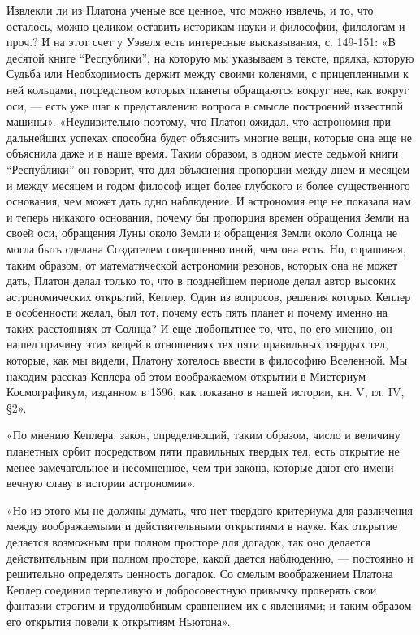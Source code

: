 Извлекли ли из Платона ученые все ценное, что можно извлечь, и то,
что осталось, можно целиком оставить историкам науки и философии,
филологам и проч.? И на этот счет у Уэвеля есть интересные
высказывания, с. 149-151: «В десятой книге ``Республики'', на которую
мы указываем в тексте, прялка, которую Судьба или Необходимость держит
между своими коленями, с прицепленными к ней кольцами, посредством
которых планеты обращаются вокруг нее, как вокруг оси, --- есть уже
шаг к представлению вопроса в смысле построений известной машины».
«Неудивительно поэтому, что Платон ожидал, что астрономия при
дальнейших успехах способна будет объяснить многие вещи, которые она
еще не объяснила даже и в наше время. Таким образом, в одном месте
седьмой книги ``Республики'' он говорит, что для объяснения пропорции
между днем и месяцем и между месяцем и годом философ ищет более
глубокого и более существенного основания, чем может дать одно
наблюдение. И астрономия еще не показала нам и теперь никакого
основания, почему бы пропорция времен обращения Земли на своей оси,
обращения Луны около Земли и обращения Земли около Солнца не могла
быть сделана Создателем совершенно иной, чем она есть. Но, спрашивая,
таким образом, от математической астрономии резонов, которых она не
может дать, Платон делал только то, что в позднейшем периоде делал
автор высоких астрономических открытий, Кеплер. Один из вопросов,
решения которых Кеплер в особенности желал, был тот, почему есть пять
планет и почему именно на таких расстояниях от Солнца? И еще
любопытнее то, что, по его мнению, он нашел причину этих вещей в
отношениях тех пяти правильных твердых тел, которые, как мы видели,
Платону хотелось ввести в философию Вселенной. Мы находим рассказ
Кеплера об этом воображаемом открытии в Мистериум Космографикум,
изданном в 1596, как показано в нашей истории, кн. V, гл. IV, §2».

«По мнению Кеплера, закон, определяющий, таким образом, число и
величину планетных орбит посредством пяти правильных твердых тел, есть
открытие не менее замечательное и несомненное, чем три закона, которые
дают его имени вечную славу в истории астрономии».

«Но из этого мы не должны думать, что нет твердого критериума для
различения между воображаемыми и действительными открытиями в науке.
Как открытие делается возможным при полном просторе для догадок, так
оно делается действительным при полном просторе, какой дается
наблюдению, --- постоянно и решительно определять ценность догадок. Со
смелым воображением Платона Кеплер соединил терпеливую и
добросовестную привычку проверять свои фантазии строгим и трудолюбивым
сравнением их с явлениями; и таким образом его открытия повели к
открытиям Ньютона».

